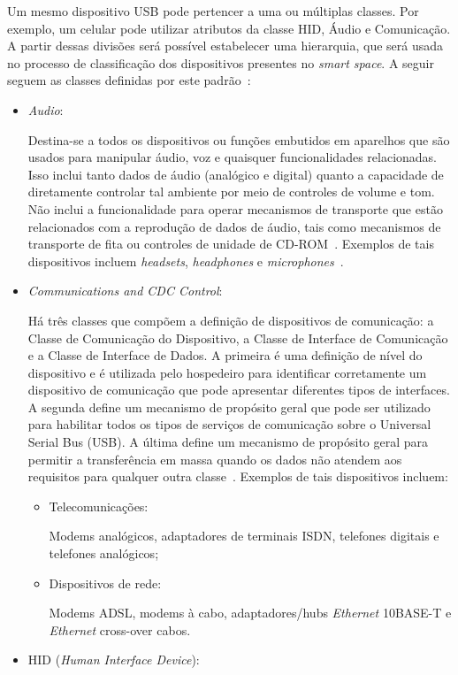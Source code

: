 Um mesmo dispositivo USB pode pertencer a uma ou múltiplas classes. Por exemplo, um celular pode utilizar atributos da classe HID, Áudio e Comunicação. A partir dessas divisões será possível estabelecer uma hierarquia, que será usada no processo de classificação dos dispositivos presentes no \emph{smart space}. A seguir seguem as classes definidas por este padrão~\cite{usbclasscodes}:

\begin{itemize}
	\item \emph{Audio}: 

	Destina-se a todos os dispositivos ou funções embutidos em aparelhos que são usados para manipular áudio, voz e quaisquer funcionalidades relacionadas. Isso inclui tanto dados de áudio (analógico e digital) quanto a capacidade de diretamente controlar tal ambiente por meio de controles de volume e tom. Não inclui a funcionalidade para operar mecanismos de transporte que estão relacionados com a reprodução de dados de áudio, tais como mecanismos de transporte de fita ou controles de unidade de CD-ROM~\cite{usbaudioclass}. Exemplos de tais dispositivos incluem \emph{headsets}, \emph{headphones} e \emph{microphones}~\cite{usbbasicaudioclass}.
	\item \emph{Communications and CDC Control}: 

	Há três classes que compõem a definição de dispositivos de comunicação: a Classe de Comunicação do Dispositivo, a Classe de Interface de Comunicação e a Classe de Interface de Dados. A primeira é uma definição de nível do dispositivo e é utilizada pelo hospedeiro para identificar corretamente um dispositivo de comunicação que pode apresentar diferentes tipos de interfaces. A segunda define um mecanismo de propósito geral que pode ser utilizado para habilitar todos os tipos de serviços de comunicação sobre o Universal Serial Bus (USB). A última define um mecanismo de propósito geral para permitir a transferência em massa quando os dados não atendem aos requisitos para qualquer outra classe~\cite{usbcommunicationclass}.	Exemplos de tais dispositivos incluem:
	\begin{itemize}
		\item Telecomunicações: 

		Modems analógicos, adaptadores de terminais ISDN, telefones digitais e telefones analógicos;
		\item Dispositivos de rede: 

		Modems ADSL, modems à cabo, adaptadores/hubs \emph{Ethernet} 10BASE-T e \emph{Ethernet} cross-over cabos.
	\end{itemize}
	\item HID (\emph{Human Interface Device}): 


\end{itemize}
